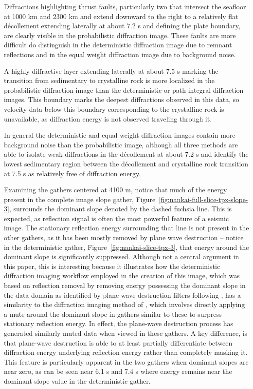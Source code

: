 Diffractions highlighting thrust faults, particularly two that intersect the seafloor at 1000 km and 2300 km and extend downward to the right to a relatively flat d\'ecollement extending laterally at about 7.2 s and defining the plate boundary, are clearly visible in the probabilistic diffraction image. These faults are more difficult do distinguish in the deterministic diffraction image due to remnant reflections and in the equal weight diffraction image due to background noise.

A highly diffractive layer extending laterally at about 7.5 s marking the transition from sedimentary to crystalline rock is more localized in the probabilistic diffraction image than the deterministic or path integral diffraction images. This boundary marks the deepest diffractions observed in this data, so velocity data below this boundary corresponding to the crystalline rock is unavailable, as diffraction energy is not observed traveling through it.

In general the deterministic and equal weight diffraction images contain more background noise than the probabilistic image, although all three methods are able to isolate weak diffractions in the d\'ecollement at about 7.2 s and identify the lowest sedimentary region between the d\'ecollement and crystalline rock transition at 7.5 s as relatively free of diffraction energy.

Examining the gathers centered at 4100 m, notice that much of the energy present in the complete image slope gather, Figure~\ref{fig:nankai-full-slice-tpx-slope-3}, surrounds the dominant slope denoted by the dashed fuchsia line.  This is expected, as reflection signal is often the most powerful feature of a seismic image.  The stationary reflection energy surrounding that line is not present in the other gathers, as it has been mostly removed by plane wave destruction -- notice in the deterministic gather, Figure~\ref{fig:nankai-slice-tpx-3}, that energy around the dominant slope is significantly suppressed.  Although not a central argument in this paper, this is interesting because it illustrates how the deterministic diffraction imaging workflow employed in the creation of this image, which was based on reflection removal by removing energy possessing the dominant slope in the data domain as identified by plane-wave destruction filters following \cite{fomel1}, has a similarity to the diffraction imaging method of \cite{moser}, which involves directly applying a mute around the dominant slope in gathers similar to these to surpress stationary reflection energy.  In effect, the plane-wave destruction process has generated similarly muted data when viewed in these gathers.  A key difference, is that plane-wave destruction is able to at least partially differentiate between diffraction energy underlying reflection energy rather than completely masking it.  This feature is particularly apparent in the two gathers when dominant slopes are near zero, as can be seen near 6.1 s and 7.4 s where energy remains near the dominant slope value in the deterministic gather.

